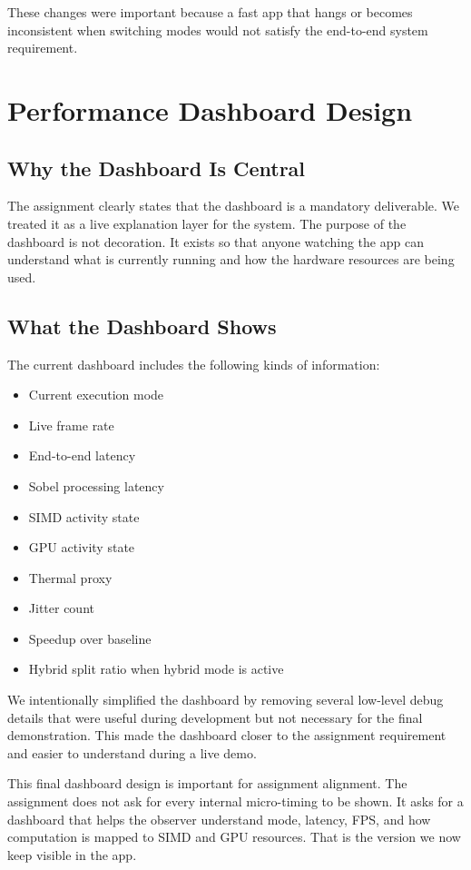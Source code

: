 \documentclass[12pt,a4paper]{article}
\begin{document}
These changes were important because a fast app that hangs or becomes inconsistent when switching modes would not satisfy the end-to-end system requirement.

\section{Performance Dashboard Design}

\subsection{Why the Dashboard Is Central}

The assignment clearly states that the dashboard is a mandatory deliverable. We treated it as a live explanation layer for the system. The purpose of the dashboard is not decoration. It exists so that anyone watching the app can understand what is currently running and how the hardware resources are being used.

\subsection{What the Dashboard Shows}

The current dashboard includes the following kinds of information:

\begin{itemize}
\item Current execution mode
\item Live frame rate
\item End-to-end latency
\item Sobel processing latency
\item SIMD activity state
\item GPU activity state
\item Thermal proxy
\item Jitter count
\item Speedup over baseline
\item Hybrid split ratio when hybrid mode is active
\end{itemize}

We intentionally simplified the dashboard by removing several low-level debug details that were useful during development but not necessary for the final demonstration. This made the dashboard closer to the assignment requirement and easier to understand during a live demo.

This final dashboard design is important for assignment alignment. The assignment does not ask for every internal micro-timing to be shown. It asks for a dashboard that helps the observer understand mode, latency, FPS, and how computation is mapped to SIMD and GPU resources. That is the version we now keep visible in the app.
\end{document}
